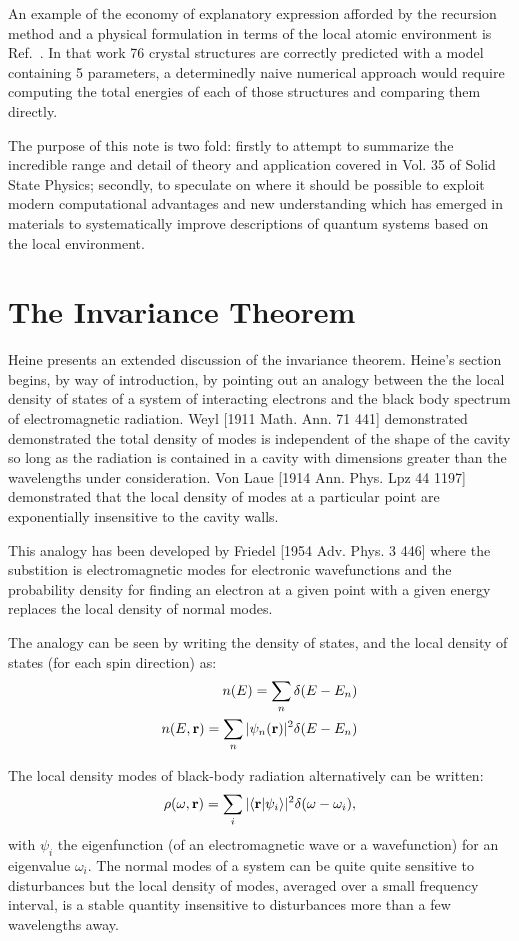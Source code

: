 \documentclass{article}
\def\ket{\rangle}
\def\bra{\langle}
\def\r{{\bf r}}
\begin{document}
An example of the economy of explanatory expression afforded by the recursion method
and a physical formulation in terms of the local atomic environment
is Ref.~\cite{johannes76}. In that work 76 crystal structures are correctly predicted 
with a model containing 5 parameters, a determinedly naive numerical approach would
require computing the total energies of each of those structures and comparing them directly.

The purpose of this note is two fold: firstly to attempt to summarize the incredible range and
detail of theory and application covered in Vol. 35 of Solid State Physics; secondly, to speculate on where 
it should be possible to exploit modern computational advantages and new understanding 
which has emerged in materials to systematically improve descriptions of quantum systems based
on the local environment. 

\section{The Invariance Theorem}
\label{sec:invariance}
Heine presents an extended discussion of the invariance
theorem. Heine's section begins, by way of introduction, by pointing 
out an analogy between the the local density of states of a system of interacting
electrons and the black body spectrum of electromagnetic radiation.
Weyl [1911 Math. Ann. 71 441] demonstrated demonstrated the total density
of modes is independent of the shape of the cavity so long as the
radiation is contained in a cavity with dimensions greater than the wavelengths
under consideration. Von Laue [1914 Ann. Phys. Lpz 44 1197] demonstrated that the local density of modes at 
a particular point are exponentially insensitive to the cavity walls.

This analogy has been developed by Friedel [1954 Adv. Phys. 3 446] where
the substition is electromagnetic modes for electronic wavefunctions and
the probability density for finding an electron at a given point
with a given energy replaces the local density of normal modes.\cite{annett94}

The analogy can be seen by writing the density of states,
and the local density of states (for each spin direction) as:
%
\begin{eqnarray}
n(E) = \sum_{n}\delta(E-E_{n}) \\
n(E,\r) = \sum_{n} |\psi_{n}(\r)|^{2}\delta(E-E_{n})
\end{eqnarray}
%

The local density modes of black-body radiation alternatively can be written:
%
\begin{equation}
\rho(\omega,\r)= \sum_{i} |\bra \r| \psi_{i}\ket|^{2}\delta(\omega-\omega_{i}),
\end{equation}
%
with $\psi_{i}$ the eigenfunction (of an electromagnetic wave or a wavefunction) for an eigenvalue $\omega_{i}$.\cite{annett94}
The normal modes of a system can be quite quite sensitive to disturbances but the 
local density of modes, averaged over a small frequency interval, is a stable quantity 
insensitive to disturbances more than a few wavelengths away.
\end{document}
